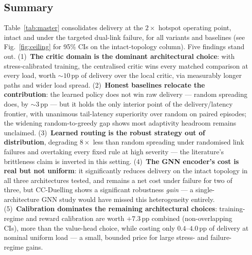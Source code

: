 \documentclass[10pt,journal,comsoc]{IEEEtran}
\begin{document}
\subsection{Summary}
\label{sec:summary}
Table~\ref{tab:master} consolidates delivery at the $2\times$ hotspot operating point, intact and under the targeted dual-link failure, for all variants and baselines (see Fig.~\ref{fig:ceiling} for 95\% CIs on the intact-topology column). Five findings stand out. (1)~\textbf{The critic domain is the dominant architectural choice}: with stress-calibrated training, the centralised critic wins every matched comparison at every load, worth ${\sim}10$\,pp of delivery over the local critic, via measurably longer paths and wider load spread. (2)~\textbf{Honest baselines relocate the contribution}: the learned policy does not win raw delivery --- random spreading does, by ${\sim}3$\,pp --- but it holds the only interior point of the delivery/latency frontier, with unanimous tail-latency superiority over random on paired episodes; the widening random-to-greedy gap shows most adaptivity headroom remains unclaimed. (3)~\textbf{Learned routing is the robust strategy out of distribution}, degrading $8\times$ less than random spreading under randomised link failures and overtaking every fixed rule at high severity --- the literature's brittleness claim is inverted in this setting. (4)~\textbf{The GNN encoder's cost is real but not uniform}: it significantly reduces delivery on the intact topology in all three architectures tested, and remains a net cost under failure for two of three, but CC-Duelling shows a significant robustness \emph{gain} --- a single-architecture GNN study would have missed this heterogeneity entirely. (5)~\textbf{Calibration dominates the remaining architectural choices}: training-regime and reward calibration are worth $+7.3$\,pp combined (non-overlapping CIs), more than the value-head choice, while costing only $0.4$--$4.0$\,pp of delivery at nominal uniform load --- a small, bounded price for large stress- and failure-regime gains.
\end{document}
